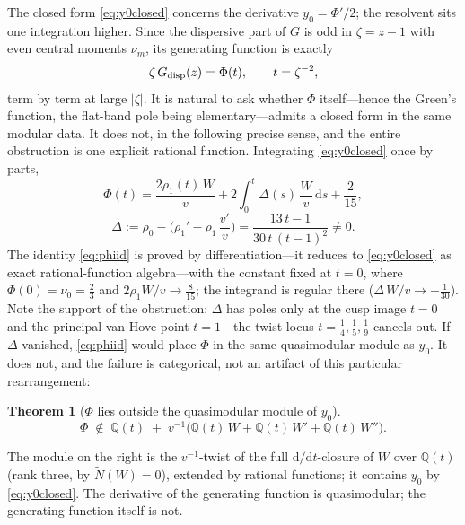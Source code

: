 \documentclass[11pt]{article}
\newcommand{\rmd}{\mathrm{d}}
\theoremstyle{plain}
\newtheorem{thm}{Theorem}[section]
\theoremstyle{remark}
\begin{document}
The closed form \eqref{eq:y0closed} concerns the derivative $y_0=\Phi'/2$; the resolvent sits one
integration higher. Since the dispersive part of $G$ is odd in $\zeta=z-1$ with even central moments
$\nu_m$, its generating function is exactly
\begin{equation}
\zeta\,G_{\rm disp}(z)=\Phi(t),\qquad t=\zeta^{-2},
\label{eq:zetaG}
\end{equation}
term by term at large $|\zeta|$. It is natural to ask whether $\Phi$ itself---hence the Green's
function, the flat-band pole being elementary---admits a closed form in the same modular data. It
does not, in the following precise sense, and the entire obstruction is one explicit rational
function. Integrating \eqref{eq:y0closed} once by parts,
\begin{equation}
\Phi(t)=\frac{2\rho_1(t)\,W}{v}+2\!\int_0^{t}\!\Delta(s)\,\frac{W}{v}\,\rmd s+\frac{2}{15},
\label{eq:phiid}
\end{equation}
\begin{equation}
\Delta:=\rho_0-\Big(\rho_1'-\rho_1\,\frac{v'}{v}\Big)
=\frac{13\,t-1}{30\,t\,(t-1)^2}\neq0.
\label{eq:Delta}
\end{equation}
The identity \eqref{eq:phiid} is proved by differentiation---it reduces to \eqref{eq:y0closed} as
exact rational-function algebra---with the constant fixed at $t=0$, where $\Phi(0)=\nu_0=\tfrac23$
and $2\rho_1W/v\to\tfrac8{15}$; the integrand is regular there ($\Delta\,W/v\to-\tfrac1{30}$). Note
the support of the obstruction: $\Delta$ has poles only at the cusp image $t=0$ and the principal
van Hove point $t=1$---the twist locus $t=\tfrac14,\tfrac15,\tfrac19$ cancels out. If $\Delta$
vanished, \eqref{eq:phiid} would place $\Phi$ in the same quasimodular module as $y_0$. It does not,
and the failure is categorical, not an artifact of this particular rearrangement:

\begin{thm}[$\Phi$ lies outside the quasimodular module of $y_0$]\label{thm:phi}
\begin{equation}
\Phi\;\notin\;\mathbb{Q}(t)\;+\;v^{-1}\big(\mathbb{Q}(t)\,W+\mathbb{Q}(t)\,W'+\mathbb{Q}(t)\,W''\big).
\label{eq:phithm}
\end{equation}
\end{thm}

The module on the right is the $v^{-1}$-twist of the full $\rmd/\rmd t$-closure of $W$ over
$\mathbb{Q}(t)$ (rank three, by $\widetilde N(W)=0$), extended by rational functions; it contains
$y_0$ by \eqref{eq:y0closed}. The derivative of the generating function is quasimodular; the
generating function itself is not.
\end{document}
